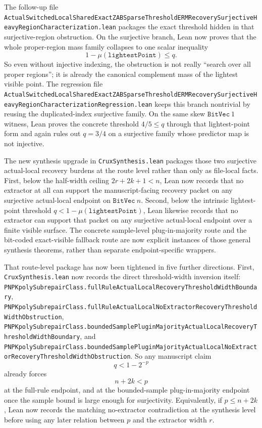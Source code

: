 \documentclass[11pt]{article}
\theoremstyle{remark}
\begin{document}
The follow-up file
\texttt{ActualSwitchedLocalSharedExactZABSparseThresholdERMRecoverySurjectiveHeavyRegionCharacterization.lean}
packages the exact threshold hidden in that surjective-region obstruction.  On
the surjective branch, Lean now proves that the whole proper-region mass family
collapses to one scalar inequality
\[
  1 - \mu(\texttt{lightestPoint}) \le q.
\]
So even without injective indexing, the obstruction is not really ``search over
all proper regions''; it is already the canonical complement mass of the
lightest visible point.  The regression file
\texttt{ActualSwitchedLocalSharedExactZABSparseThresholdERMRecoverySurjectiveHeavyRegionCharacterizationRegression.lean}
keeps this branch nontrivial by reusing the duplicated-index surjective family.
On the same skew \(\texttt{BitVec}\ 1\) witness, Lean proves the concrete
threshold \(4/5 \le q\) through that lightest-point form and again rules out
\(q = 3/4\) on a surjective family whose predictor map is not injective.

The new synthesis upgrade in \texttt{CruxSynthesis.lean} packages those two
surjective actual-local recovery burdens at the route level rather than only as
file-local facts.  First, below the half-width ceiling \(2r+2k+1<n\), Lean now
records that no extractor at all can support the manuscript-facing recovery
packet on any surjective actual-local endpoint on \(\texttt{BitVec}\ n\).
Second, below the intrinsic lightest-point threshold
\(q < 1-\mu(\texttt{lightestPoint})\), Lean likewise records that no extractor
can support that packet on any surjective actual-local endpoint over a finite
visible surface.  The concrete sample-level plug-in-majority route and the
bit-coded exact-visible fallback route are now explicit instances of those
general synthesis theorems, rather than separate endpoint-specific wrappers.

That route-level package has now been tightened in five further directions.
First, \texttt{CruxSynthesis.lean} now records the direct threshold-width
inversion itself:
\texttt{PNPKpolySubrepairClass.fullRuleActualLocalRecoveryThresholdWidthBoundary},
\texttt{PNPKpolySubrepairClass.fullRuleActualLocalNoExtractorRecoveryThresholdWidthObstruction},
\texttt{PNPKpolySubrepairClass.boundedSamplePluginMajorityActualLocalRecoveryThresholdWidthBoundary},
and
\texttt{PNPKpolySubrepairClass.boundedSamplePluginMajorityActualLocalNoExtractorRecoveryThresholdWidthObstruction}.
So any manuscript claim
\[
  q < 1 - 2^{-p}
\]
already forces
\[
  n + 2k < p
\]
at the full-rule endpoint, and at the bounded-sample plug-in-majority endpoint
once the sample bound is large enough for surjectivity.  Equivalently, if
\(p \le n+2k\), Lean now records the matching no-extractor contradiction at the
synthesis level before using any later relation between \(p\) and the
extractor width \(r\).
\end{document}
